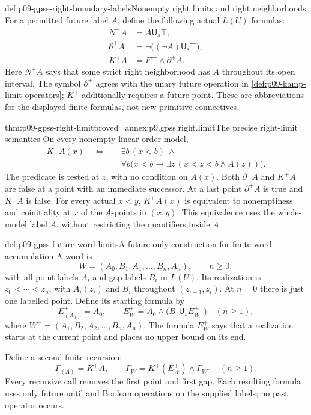 \begin{hbdefinition}{def:p09-gpss-right-boundary-labels}{Nonempty right limits and right neighborhoods}
For a permitted future label \(A\), define the following actual \(L(U)\)
formulas:
\[
\begin{aligned}
 N^+A&=A\mathbin{\mathsf U_s}\top,\\
 \partial^+A&=\neg\bigl((\neg A)\mathbin{\mathsf U_s}\top\bigr),\\
 K^+A&=F\top\land\partial^+A.
\end{aligned}
\]
Here \(N^+A\) says that some strict right neighborhood has \(A\)
throughout its open interval. The symbol \(\partial^+\) agrees with
the unary future operation in \cref{def:p09-kamp-limit-operators};
\(K^+\) additionally requires a future point. These are abbreviations
for the displayed finite formulas, not new primitive connectives.
\end{hbdefinition}

\begin{hblemma}{thm:p09-gpss-right-limit}{proved=annex:p9.gpss.right.limit}{The precise right-limit semantics}
On every nonempty linear-order model,
\[
\begin{split}
 K^+A(x)\quad\Longleftrightarrow\quad&
 \exists b\,(x<b)\ \land\\
 &\forall b\bigl(x<b\longrightarrow
            \exists z\,(x<z<b\land A(z))\bigr).
\end{split}
\]
The predicate is tested at \(z\), with no condition on \(A(x)\).
Both \(\partial^+A\) and \(K^+A\) are false at a point with an
immediate successor. At a last point \(\partial^+A\) is true and
\(K^+A\) is false. For every actual \(x<y\), \(K^+A(x)\)
is equivalent to nonemptiness and coinitiality at \(x\) of the
\(A\)-points in \((x,y)\). This equivalence uses the whole-model
label \(A\), without restricting the quantifiers inside \(A\).
\end{hblemma}

\begin{hbdefinition}{def:p09-gpss-future-word-limits}{A future-only construction for finite-word accumulation}
A word is
\[
 W=(A_0,B_1,A_1,\ldots,B_n,A_n),\qquad n\geq0,
\]
with all point labels \(A_i\) and gap labels \(B_i\) in \(L(U)\).
Its realization is \(z_0<\cdots<z_n\), with \(A_i(z_i)\)
and \(B_i\) throughout \((z_{i-1},z_i)\). At \(n=0\)
there is just one labelled point. Define its starting formula by
\[
 E^+_{(A_0)}=A_0,\qquad
 E^+_W=A_0\land
             \bigl(B_1\mathbin{\mathsf U_s}E^+_{W^-}\bigr)
                    \quad(n\geq1),
\]
where \(W^-=(A_1,B_2,A_2,\ldots,B_n,A_n)\).
The formula \(E^+_W\) says that a realization starts at the current
point and places no upper bound on its end.

Define a second finite recursion:
\[
 \Gamma_{(A)}=K^+A,\qquad
 \Gamma_W=K^+(E^+_W)\land\Gamma_{W^-}\quad(n\geq1).
\]
Every recursive call removes the first point and first gap. Each resulting
formula uses only future until and Boolean operations on the supplied
labels; no past operator occurs.
\end{hbdefinition}


